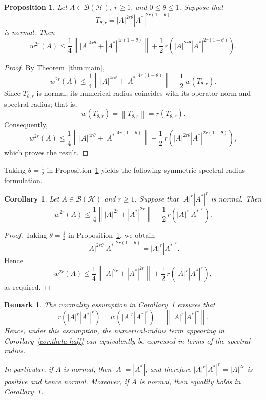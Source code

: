\documentclass[final,1p,times]{elsarticle}
\newtheorem{rem}[thm]{Remark}
\newtheorem{prop}[thm]{Proposition}
\newtheorem{cor}[thm]{Corollary}
\newcommand{\BH}{\mathcal{B}(\mathcal{H})}
\newcommand{\norm}[1]{\left\lVert #1 \right\rVert}
\begin{document}
\begin{prop}\label{thm:spectral}
Let $A\in\BH$, $r\geq1$, and $0\leq\theta\leq1$. Suppose that
\[
T_{\theta,r}
=
|A|^{2r\theta}|A^*|^{2r(1-\theta)}
\]
is normal. Then
\[
w^{2r}(A)
\leq
\frac14
\norm{
|A|^{4r\theta}
+
|A^*|^{4r(1-\theta)}
}
+
\frac12\,
r\!\left(
|A|^{2r\theta}|A^*|^{2r(1-\theta)}
\right).
\]
\end{prop}

\begin{proof}
By Theorem~\ref{thm:main},
\[
w^{2r}(A)
\leq
\frac14
\norm{
|A|^{4r\theta}
+
|A^*|^{4r(1-\theta)}
}
+
\frac12\,
w(T_{\theta,r}).
\]
Since $T_{\theta,r}$ is normal, its numerical radius coincides with
its operator norm and spectral radius; that is,
\[
w(T_{\theta,r})
=
\norm{T_{\theta,r}}
=
r(T_{\theta,r}).
\]
Consequently,
\[
w^{2r}(A)
\leq
\frac14
\norm{
|A|^{4r\theta}
+
|A^*|^{4r(1-\theta)}
}
+
\frac12\,
r\!\left(
|A|^{2r\theta}|A^*|^{2r(1-\theta)}
\right),
\]
which proves the result.
\end{proof}

\medskip

Taking $\theta=\frac12$ in Proposition~\ref{thm:spectral} yields the following symmetric spectral-radius formulation.

\begin{cor}\label{cor:spectral-dominance}
Let $A\in\BH$ and $r\geq1$. Suppose that $|A|^r|A^*|^r$
is normal. Then
\[
w^{2r}(A)
\leq
\frac14\norm{|A|^{2r}+|A^*|^{2r}}
+
\frac12\,r\!\left(|A|^r|A^*|^r\right).
\]
\end{cor}

\begin{proof}
Taking $\theta=\frac12$ in Proposition~\ref{thm:spectral}, we obtain
\[
|A|^{2r\theta}|A^*|^{2r(1-\theta)}
=
|A|^r|A^*|^r.
\]
Hence
\[
w^{2r}(A)
\leq
\frac14\norm{|A|^{2r}+|A^*|^{2r}}
+
\frac12\,r\!\left(|A|^r|A^*|^r\right),
\]
as required.
\end{proof}

\begin{rem}
The normality assumption in Corollary~\ref{cor:spectral-dominance}
ensures that
\[
r\!\left(|A|^r|A^*|^r\right)
=
w\!\left(|A|^r|A^*|^r\right)
=
\norm{|A|^r|A^*|^r}.
\]
Hence, under this assumption, the numerical-radius term appearing in
Corollary~\ref{cor:theta-half} can equivalently be expressed in terms
of the spectral radius.

In particular, if $A$ is normal, then $|A|=|A^*|$, and therefore
$|A|^r|A^*|^r=|A|^{2r}$
is positive and hence normal. Moreover, if $A$ is normal, then equality holds in
Corollary~\ref{cor:spectral-dominance}.
\end{rem}
\end{document}
